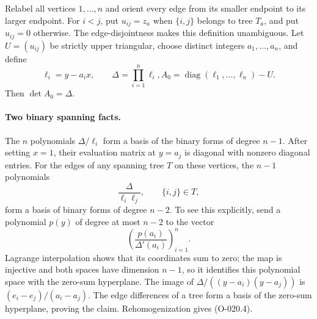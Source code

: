Relabel all vertices $1,\ldots,n$ and orient every edge
from its smaller endpoint to its larger endpoint. For
$i<j$, put $u_{ij}=z_a$ when $\{i,j\}$ belongs to
tree $T_a$, and put $u_{ij}=0$ otherwise. The edge-disjointness
makes this definition unambiguous. Let $U=(u_{ij})$ be
strictly upper triangular, choose distinct integers
$a_1,\ldots,a_n$, and define
\[
 \ell_i=y-a_ix,\qquad \Delta=\prod_{i=1}^n\ell_i,
             A_0=\operatorname{diag}(\ell_1,\ldots,\ell_n)-U.
                                                               \tag{O-020.3}
\]
Then $\det A_0=\Delta$.

\paragraph{Two binary spanning facts.}
The $n$ polynomials $\Delta/\ell_i$ form a basis of the
binary forms of degree $n-1$. After setting $x=1$, their
evaluation matrix at $y=a_j$ is diagonal with nonzero
diagonal entries.
For the edges of any spanning tree $T$ on these vertices,
the $n-1$ polynomials
\[
                           \frac{\Delta}{\ell_i\ell_j},
                                   \qquad\{i,j\}\in T,          \tag{O-020.4}
\]
form a basis of binary forms of degree $n-2$.
To see this explicitly, send a polynomial $p(y)$ of degree
at most $n-2$ to the vector
\[
                \left(\frac{p(a_i)}{\Delta'(a_i)}\right)_{i=1}^n.
\]
Lagrange interpolation shows that its coordinates sum to
zero; the map is injective and both spaces have dimension
$n-1$, so it identifies this polynomial space with the
zero-sum hyperplane. The image of
$\Delta/((y-a_i)(y-a_j))$ is
$(e_i-e_j)/(a_i-a_j)$. The edge differences of a tree
form a basis of the zero-sum hyperplane, proving the claim.
Rehomogenization gives (O-020.4).

